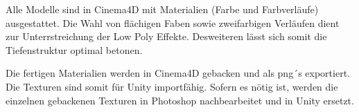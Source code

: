 
Alle Modelle sind in Cinema4D mit Materialien (Farbe und Farbverläufe) ausgestattet. Die Wahl von flächigen Faben sowie zweifarbigen Verläufen dient zur Unterrstreichung der Low Poly Effekte. Desweiteren lässt sich somit die Tiefenstruktur optimal betonen.

Die fertigen Materialien werden in Cinema4D gebacken und als png´s exportiert. Die Texturen sind somit für Unity importfähig. Sofern es nötig ist, werden die einzelnen gebackenen Texturen in Photoshop nachbearbeitet und in Unity ersetzt.